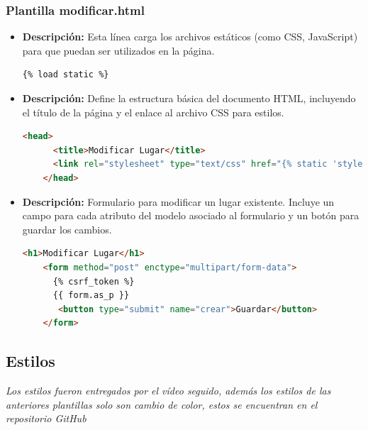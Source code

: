 \documentclass{article}
\begin{document}
  \subsubsection{Plantilla modificar.html}
  \begin{itemize}
    \item \textbf{Descripción: }Esta línea carga los archivos estáticos (como CSS, JavaScript) para que puedan ser utilizados en la página.
    \begin{lstlisting}[language=html]
    {% load static %}
    \end{lstlisting}
    \item \textbf{Descripción: }Define la estructura básica del documento HTML, incluyendo el título de la página y el enlace al archivo 
    CSS para estilos.
    \begin{lstlisting}[language=html]
    <head>
      <title>Modificar Lugar</title>
      <link rel="stylesheet" type="text/css" href="{% static 'styles/styles1.css' %}">
    </head>
    \end{lstlisting}
    \item \textbf{Descripción: }Formulario para modificar un lugar existente. Incluye un campo para cada atributo del modelo asociado al formulario y 
    un botón para guardar los cambios.
    \begin{lstlisting}[language=html]
    <h1>Modificar Lugar</h1>
    <form method="post" enctype="multipart/form-data">
      {% csrf_token %}
      {{ form.as_p }}
       <button type="submit" name="crear">Guardar</button>
    </form>
    \end{lstlisting}
  \end{itemize}
  

  \subsection{Estilos}
  \textit{Los estilos fueron entregados por el vídeo seguido, además los estilos de las anteriores plantillas solo son cambio de color, estos se encuentran en el repositorio GitHub}
  
\end{document}
